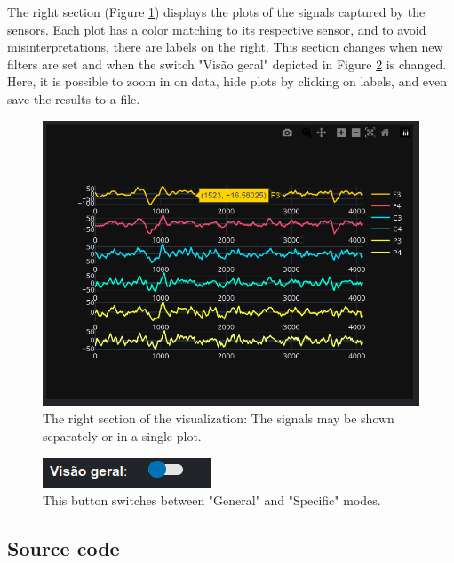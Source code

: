 \documentclass[format=sigconf]{acmart}
\begin{document}
			
		
			\par The right section (Figure \ref{fig:screenshotright}) displays the plots of the signals captured by the sensors. Each plot has a color matching to its respective sensor, and to avoid misinterpretations, there are labels on the right. This section changes when new filters are set and when the switch "Visão geral" depicted in Figure \ref{fig:screenshotbotton} is changed. Here, it is possible to zoom in on data, hide plots by clicking on labels, and even save the results to a file.
			
			\begin{figure}[h]
				\centering
				\includegraphics[width=\linewidth]{images/screenshotRight}
				\caption{The right section of the visualization: The signals may be shown separately or in a single plot.}
				\label{fig:screenshotright}
			\end{figure}
			
			
			\begin{figure}[h]
				\centering
				\includegraphics{images/screenshotBotton}
				\caption{This button switches between "General" and "Specific" modes.}
				\label{fig:screenshotbotton}
			\end{figure}
		\subsection{Source code}
		
\end{document}
